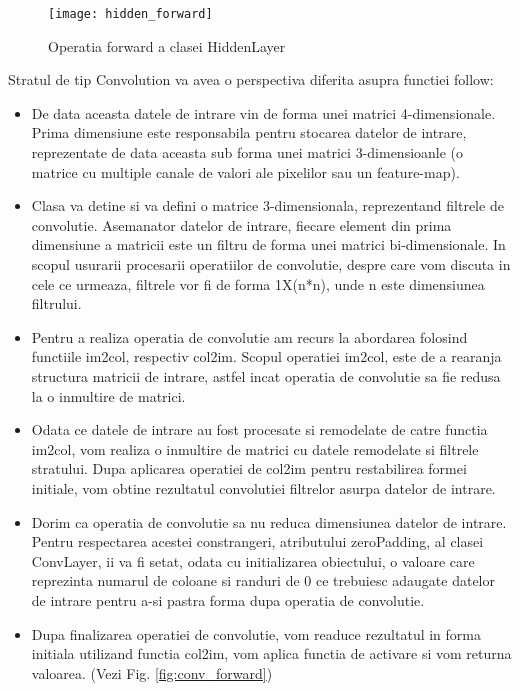 	
	\begin{figure}[H]
		\texttt{[image: hidden\_forward]}  
		\caption{\label{fig:hidden_forward} Operatia forward a clasei HiddenLayer}
	\end{figure}

	\newpage
	
	Stratul de tip Convolution va avea o perspectiva diferita asupra functiei follow:
	\begin{itemize}
		
	\item	 De data aceasta datele de intrare vin de forma unei matrici 4-dimensionale. Prima dimensiune este responsabila pentru stocarea datelor de intrare, reprezentate de data aceasta sub forma unei matrici 3-dimensioanle (o matrice cu multiple canale de valori ale pixelilor sau un feature-map).
	
	\item	Clasa va detine si va defini o matrice 3-dimensionala, reprezentand filtrele de convolutie. Asemanator datelor de intrare, fiecare element din prima dimensiune a matricii este un filtru de forma unei matrici bi-dimensionale. In scopul usurarii procesarii operatiilor de convolutie, despre care vom discuta in cele ce urmeaza, filtrele vor fi de forma 1X(n*n), unde n este dimensiunea filtrului.
	
	
	\item	Pentru a realiza operatia de convolutie am recurs la abordarea folosind functiile im2col, respectiv col2im. Scopul operatiei im2col, este de a rearanja structura matricii de intrare, astfel incat operatia de convolutie sa fie redusa la o inmultire de matrici.
	
	\item	Odata ce datele de intrare au fost procesate si remodelate de catre functia im2col, vom realiza o inmultire de matrici cu datele remodelate si filtrele stratului. Dupa aplicarea operatiei de col2im pentru restabilirea formei initiale, vom obtine rezultatul convolutiei filtrelor asurpa datelor de intrare.
	
	
	\item	Dorim ca operatia de convolutie sa nu reduca dimensiunea datelor de intrare. Pentru respectarea acestei constrangeri, atributului zeroPadding, al clasei ConvLayer, ii va fi setat, odata cu initializarea obiectului, o valoare care reprezinta numarul de coloane si randuri de 0 ce trebuiesc adaugate datelor de intrare pentru a-si pastra forma dupa operatia de convolutie.
	
	\item	Dupa finalizarea operatiei de convolutie, vom readuce rezultatul in forma initiala utilizand functia col2im, vom aplica functia de activare si vom returna valoarea. 	(Vezi Fig. \ref{fig:conv_forward})

	\end{itemize}

